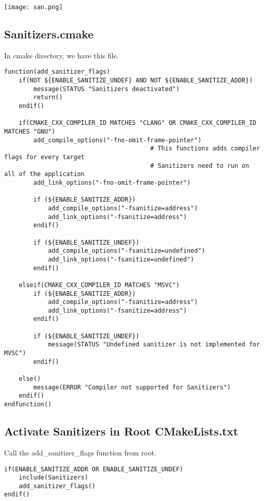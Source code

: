 \begin{center}
    \texttt{[image: san.png]}
\end{center}


\subsection{Sanitizers.cmake}

In cmake directory, we have this file.


\begin{verbatim}
function(add_sanitizer_flags)
    if(NOT ${ENABLE_SANITIZE_UNDEF} AND NOT ${ENABLE_SANITIZE_ADDR})
        message(STATUS "Sanitizers deactivated") 
        return()
    endif()

    if(CMAKE_CXX_COMPILER_ID MATCHES "CLANG" OR CMAKE_CXX_COMPILER_ID MATCHES "GNU")
        add_compile_options("-fno-omit-frame-pointer")   
                                        # This functions adds compiler flags for every target
                                        # Sanitizers need to run on all of the application
        add_link_options("-fno-omit-frame-pointer")

        if (${ENABLE_SANITIZE_ADDR})
            add_compile_options("-fsanitize=address") 
            add_link_options("-fsanitize=address") 
        endif()

        if (${ENABLE_SANITIZE_UNDEF})
            add_compile_options("-fsanitize=undefined") 
            add_link_options("-fsanitize=undefined") 
        endif()

    elseif(CMAKE_CXX_COMPILER_ID MATCHES "MSVC")
        if (${ENABLE_SANITIZE_ADDR})
            add_compile_options("-fsanitize=address") 
            add_link_options("-fsanitize=address") 
        endif()

        if (${ENABLE_SANITIZE_UNDEF})
            message(STATUS "Undefined sanitizer is not implemented for MVSC")
        endif()

    else() 
        message(ERROR "Compiler not supported for Sanitizers")
    endif()
endfunction()
\end{verbatim}


\subsection{Activate Sanitizers in Root CMakeLists.txt}

Call the add\_sanitizer\_flags function from root.

\begin{verbatim}
if(ENABLE_SANITIZE_ADDR OR ENABLE_SANITIZE_UNDEF)
    include(Sanitizers)
    add_sanitizer_flags()
endif()
\end{verbatim}

